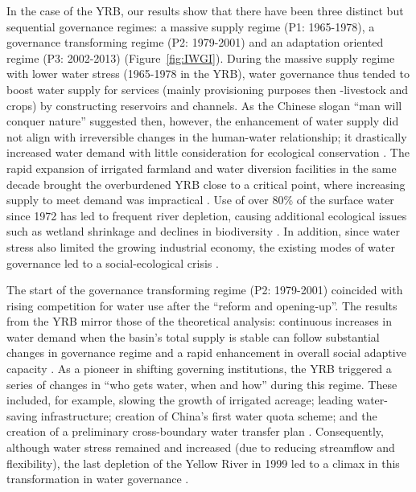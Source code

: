 In the case of the YRB, our results show that there have been three distinct but sequential governance regimes: a massive supply regime (P1: 1965-1978), a governance transforming regime (P2: 1979-2001) and an adaptation oriented regime (P3: 2002-2013) (Figure~\ref{fig:IWGI}).
During the massive supply regime with lower water stress (1965-1978 in the YRB), water governance thus tended to boost water supply for services (mainly provisioning purposes then -livestock and crops) by constructing reservoirs and channels.
As the Chinese slogan ``man will conquer nature'' suggested then, however, the enhancement of water supply did not align with irreversible changes in the human-water relationship; it drastically increased water demand with little consideration for ecological conservation
\cite{zhou2020}.
The rapid expansion of irrigated farmland and water diversion facilities in the same decade brought the overburdened YRB close to a critical point, where increasing supply to meet demand was impractical \cite{loch2020}.
Use of over 80\% of the surface water since 1972 has led to frequent river depletion, causing additional ecological issues such as wetland shrinkage and declines in biodiversity \cite{wang2019c}.
In addition, since water stress also limited the growing industrial economy, the existing modes of water governance led to a social-ecological crisis
\cite{wohlfart2016a}.

The start of the governance transforming regime (P2: 1979-2001) coincided with rising competition for water use after the ``reform and opening-up''.
The results from the YRB mirror those of the theoretical analysis: continuous increases in water demand when the basin's total supply is stable can follow substantial changes in governance regime and a rapid enhancement in overall social adaptive capacity \cite{loch2020}.
As a pioneer in shifting governing institutions, the YRB triggered a series of changes in ``who gets water, when and how'' during this regime. These included, for example, slowing the growth of irrigated acreage; leading water-saving infrastructure; creation of China's first water quota scheme; and the creation of a preliminary cross-boundary water transfer plan
\cite{wang2019a,long2020,nickum2021}.
Consequently, although water stress remained and increased (due to reducing streamflow and flexibility), the last depletion of the Yellow River in 1999 led to a climax in this transformation in water governance \cite{wang2019a}.

